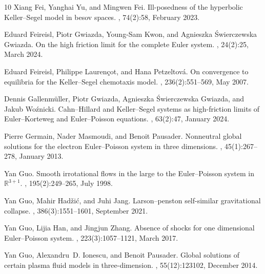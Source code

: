 \documentclass[11pt]{article}
\theoremstyle{plain}
\theoremstyle{definition}
\theoremstyle{remark}
\numberwithin{equation}{section}
\begin{document}
\begin{thebibliography}{10}
Xiang Fei, Yanghai Yu, and Mingwen Fei.
\newblock Ill-posedness of the hyperbolic Keller--Segel model in besov spaces.
, 74(2):58, February 2023.

Eduard Feireisl, Piotr Gwiazda, Young-Sam Kwon, and Agnieszka Świerczewska Gwiazda.
\newblock On the high friction limit for the complete Euler system.
, 24(2):25, March 2024.

Eduard Feireisl, Philippe Laurençot, and Hana Petzeltová.
\newblock On convergence to equilibria for the Keller--Segel chemotaxis model.
, 236(2):551--569, May 2007.

Dennis Gallenmüller, Piotr Gwiazda, Agnieszka Świerczewska Gwiazda, and Jakub Woźnicki.
\newblock Cahn--Hillard and Keller--Segel systems as high-friction limits of Euler--Korteweg and Euler--Poisson equations.
, 63(2):47, January 2024.

Pierre Germain, Nader Masmoudi, and Benoit Pausader.
\newblock Nonneutral global solutions for the electron Euler--Poisson system in three dimensions.
, 45(1):267--278, January 2013.

Yan Guo.
\newblock Smooth irrotational flows in the large to the Euler--Poisson system in $ \mathbb R^{3+1}$.
, 195(2):249--265, July 1998.

Yan Guo, Mahir Hadžić, and Juhi Jang.
\newblock Larson–penston self-similar gravitational collapse.
, 386(3):1551--1601, September 2021.

Yan Guo, Lijia Han, and Jingjun Zhang.
\newblock Absence of shocks for one dimensional Euler--Poisson system.
, 223(3):1057--1121, March 2017.

Yan Guo, Alexandru~D. Ionescu, and Benoit Pausader.
\newblock Global solutions of certain plasma fluid models in three-dimension.
, 55(12):123102, December 2014.


\end{thebibliography}
\end{document}
